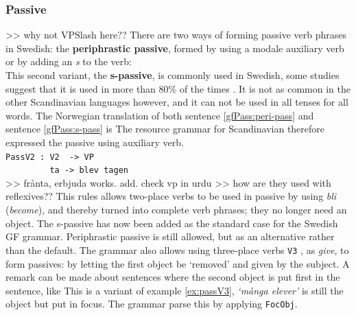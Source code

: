 \documentclass{report}
\begin{document}
\subsubsection{Passive}
>> why not VPSlash here??
There are two ways of forming passive verb phrases in Swedish: the 
\textbf{periphrastic passive}, formed by using a modale auxiliary verb \\
\label{gfPass:peri-pass}
or by adding an \emph{s} to
the verb: \\
\label{gfPass:s-pass}
This second variant, the \textbf{s-passive}, is commonly used in Swedish, some studies
suggest that it is used in more than 80\% of the times \cite{laanemets}.
It is not as common in the other Scandinavian languages however, 
and it can not be used in all tenses for all words. The Norwegian 
translation of both sentence \ref{gfPass:peri-pass} and sentence  \ref{gfPass:s-pass} is
The resource grammar for Scandinavian therefore expressed the passive using auxiliary verb. \\
\verb|PassV2 : V2  -> VP | \\
\verb|         ta -> blev tagen| \\
>> frånta, erbjuda works. add. check vp in urdu
>> how are they used with reflexives??
This rules allows two-place verbs to be used in passive by using \emph{bli} (\emph{become}), and thereby
turned into complete verb phrases; they no longer need an object.
The s-passive has now been added as the standard case for the Swedish GF
grammar. Periphrastic passive is still allowed, but as an alternative rather
than the default.
The grammar also allows using three-place verbs \verb|V3| , as \emph{give}, to
form passives:
\label{ex:passV3}
by letting the first object be `removed' and given by the subject. 
A remark can be made about sentences where the second object is put first in the sentence, like 
This is a variant of example \ref{ex:passV3}, \emph{`många elever'} is still the object but put in focus. The grammar
parse this by applying \verb|FocObj|.
\end{document}
